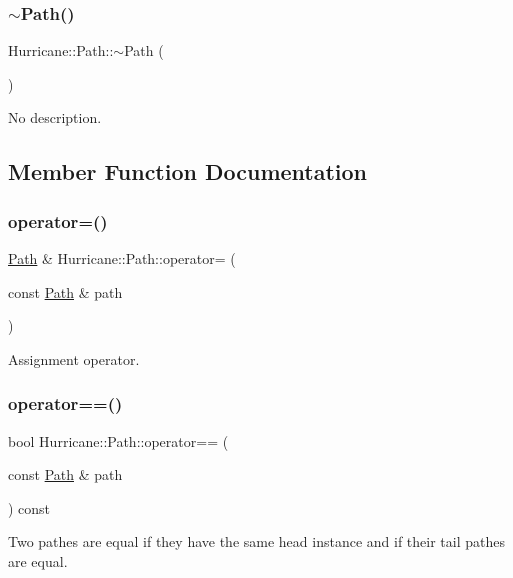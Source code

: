 \subsubsection{\texorpdfstring{$\sim$\+Path()}{~Path()}}
{\footnotesize\ttfamily Hurricane\+::\+Path\+::$\sim$\+Path (\begin{DoxyParamCaption}{ }\end{DoxyParamCaption})}

No description. 

\subsection{Member Function Documentation}
\mbox{\label{classHurricane_1_1Path_a1355dd2d191d492a1b5e5180324a9f8f}} 
\subsubsection{\texorpdfstring{operator=()}{operator=()}}
{\footnotesize\ttfamily \hyperlink{classHurricane_1_1Path}{Path} \& Hurricane\+::\+Path\+::operator= (\begin{DoxyParamCaption}\item[{const \hyperlink{classHurricane_1_1Path}{Path} \&}]{path }\end{DoxyParamCaption})}

Assignment operator. \mbox{\label{classHurricane_1_1Path_a16a5b6529dd4424c55518ac9f687862f}} 
\subsubsection{\texorpdfstring{operator==()}{operator==()}}
{\footnotesize\ttfamily bool Hurricane\+::\+Path\+::operator== (\begin{DoxyParamCaption}\item[{const \hyperlink{classHurricane_1_1Path}{Path} \&}]{path }\end{DoxyParamCaption}) const}

Two pathes are equal if they have the same head instance and if their tail pathes are equal. \mbox{\label{classHurricane_1_1Path_a182e82a2bc3f41262e1e76fcdc5a0c1e}} 
